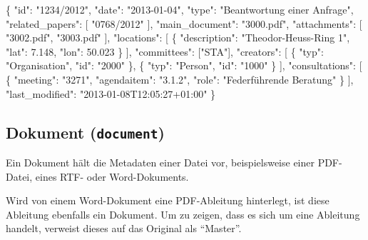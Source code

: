 \documentclass[,a4paper]{article}
\newenvironment{Shaded}{}{}
\newcommand{\DataTypeTok}[1]{\textcolor[rgb]{0.56,0.13,0.00}{{#1}}}
\newcommand{\FloatTok}[1]{\textcolor[rgb]{0.25,0.63,0.44}{{#1}}}
\newcommand{\StringTok}[1]{\textcolor[rgb]{0.25,0.44,0.63}{{#1}}}
\newcommand{\NormalTok}[1]{{#1}}
\begin{document}
\begin{Shaded}
\begin{Highlighting}[]
\NormalTok{\{}
    \DataTypeTok{"id"}\NormalTok{: }\StringTok{"1234/2012"}\NormalTok{,}
    \DataTypeTok{"date"}\NormalTok{: }\StringTok{"2013-01-04"}\NormalTok{,}
    \DataTypeTok{"type"}\NormalTok{: }\StringTok{"Beantwortung einer Anfrage"}\NormalTok{,}
    \DataTypeTok{"related_papers"}\NormalTok{: [}
        \StringTok{"0768/2012"}
    \NormalTok{],}
    \DataTypeTok{"main_document"}\NormalTok{: }\StringTok{"3000.pdf"}\NormalTok{,}
    \DataTypeTok{"attachments"}\NormalTok{: [}
        \StringTok{"3002.pdf"}\NormalTok{,}
        \StringTok{"3003.pdf"}
    \NormalTok{],}
    \DataTypeTok{"locations"}\NormalTok{: [}
        \NormalTok{\{}
            \DataTypeTok{"description"}\NormalTok{: }\StringTok{"Theodor-Heuss-Ring 1"}\NormalTok{,}
            \DataTypeTok{"lat"}\NormalTok{: }\FloatTok{7.148}\NormalTok{,}
            \DataTypeTok{"lon"}\NormalTok{: }\FloatTok{50.023}
        \NormalTok{\}}
    \NormalTok{],}
    \DataTypeTok{"committees"}\NormalTok{: [}\StringTok{"STA"}\NormalTok{],}
    \DataTypeTok{"creators"}\NormalTok{: [}
        \NormalTok{\{}
            \DataTypeTok{"typ"}\NormalTok{: }\StringTok{"Organisation"}\NormalTok{,}
            \DataTypeTok{"id"}\NormalTok{: }\StringTok{"2000"}
        \NormalTok{\},}
        \NormalTok{\{}
            \DataTypeTok{"typ"}\NormalTok{: }\StringTok{"Person"}\NormalTok{,}
            \DataTypeTok{"id"}\NormalTok{: }\StringTok{"1000"}
        \NormalTok{\}}
    \NormalTok{],}
    \DataTypeTok{"consultations"}\NormalTok{: [}
        \NormalTok{\{}
            \DataTypeTok{"meeting"}\NormalTok{: }\StringTok{"3271"}\NormalTok{,}
            \DataTypeTok{"agendaitem"}\NormalTok{: }\StringTok{"3.1.2"}\NormalTok{,}
            \DataTypeTok{"role"}\NormalTok{: }\StringTok{"Federführende Beratung"}
        \NormalTok{\}}
    \NormalTok{],}
    \DataTypeTok{"last_modified"}\NormalTok{: }\StringTok{"2013-01-08T12:05:27+01:00"}
\NormalTok{\}}
\end{Highlighting}
\end{Shaded}

\subsection{Dokument (\texttt{document})}

Ein Dokument hält die Metadaten einer Datei vor, beispielsweise einer
PDF-Datei, eines RTF- oder Word-Dokuments.

Wird von einem Word-Dokument eine PDF-Ableitung hinterlegt, ist diese
Ableitung ebenfalls ein Dokument. Um zu zeigen, dass es sich um eine
Ableitung handelt, verweist dieses auf das Original als ``Master''.
\end{document}
